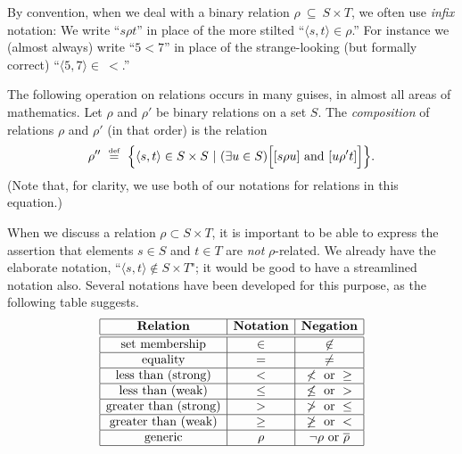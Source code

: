 By convention, when we deal with a binary relation $\rho \ \subseteq \ S \times T$, we often use {\em infix} notation: We write ``$s \rho t$'' in place of the more stilted ``$\langle s, t \rangle \in \rho$.''  For instance we (almost always) write ``$5 < 7$'' in place of the strange-looking (but formally correct) ``$\langle 5,7 \rangle \in \ <$.''

\medskip


The following operation on relations occurs in many guises, in almost all areas of mathematics.  Let $\rho$ and $\rho'$ be binary relations on a set $S$.  The {\it composition} of relations $\rho$ and $\rho'$ (in that order) is the relation
\[ 
\rho'' \ \eqdef \ \Bigl\{ \langle s, t \rangle \in S \times S \ | \
(\exists u \in S) \Bigl[ [s \rho u] \mbox{ and } [u \rho' t] \Bigr] \Bigr\}.
\]
(Note that, for clarity, we use both of our notations for relations in this equation.) 

\bigskip

\noindent {}
\bigskip

 
\noindent
When we discuss a relation $\rho \subset S \times T$, it is important to be able to express the assertion that elements $s \in S$ and $t \in T$ are {\em not} $\rho$-related.  We already have the elaborate notation, ``$\langle s, t \rangle \not\in S \times T$"; it would be good to have a streamlined notation also.  Several notations have been developed for this purpose, as the following table suggests.
\begin{equation}
\label{eq:NOT-rho-notation}
\begin{array}{|c|c|c|c|}
\hline
\mbox{\bf Relation} & \mbox{\bf Notation} & \mbox{\bf Negation}  \\
\hline
\hline
\mbox{set membership} & \in & \not\in  \\
\hline
\mbox{equality}       & =   & \neq     \\
\hline
\mbox{less than (strong)} & < & \not < \mbox{ or } \geq \\
\hline
\mbox{less than (weak)} & \leq & \not\leq \mbox{ or } >  \\
\hline
\mbox{greater than (strong)} & > & \not > \mbox{ or } \leq  \\
\hline
\mbox{greater than (weak)} & \geq & \not\geq \mbox{ or } <  \\
\hline
\mbox{generic}  & \rho  & \neg\rho \mbox{ or } \overline{\rho} \\
\hline
\end{array}
\end{equation}

